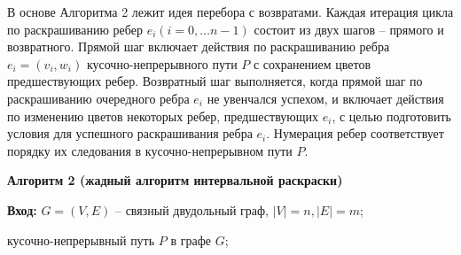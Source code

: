 \par\medskip
В основе Алгоритма 2 лежит идея перебора с возвратами. Каждая итерация цикла по раскрашиванию ребер $e_i (i=0,\dots n-1)$ состоит из двух шагов -- прямого и возвратного.
Прямой шаг включает действия по раскрашиванию ребра $e_i=(v_i,w_i)$ кусочно-непрерывного пути $P$ с сохранением цветов предшествующих ребер. Возвратный шаг выполняется, когда прямой шаг по раскрашиванию очередного ребра $e_i$ не увенчался успехом, и включает действия по изменению цветов некоторых ребер, предшествующих $e_i$, с целью подготовить условия для успешного раскрашивания ребра $e_i$.
Нумерация ребер соответствует порядку их следования в кусочно-непрерывном пути $P$.
\par\medskip
\textbf{ Алгоритм 2 (жадный алгоритм интервальной раскраски)}
\par\smallskip
\textbf{ Вход: } $G=(V,E)$ -- связный двудольный граф, $|V|=n, |E|=m$;

кусочно-непрерывный путь $P$ в графе $G$;
%

